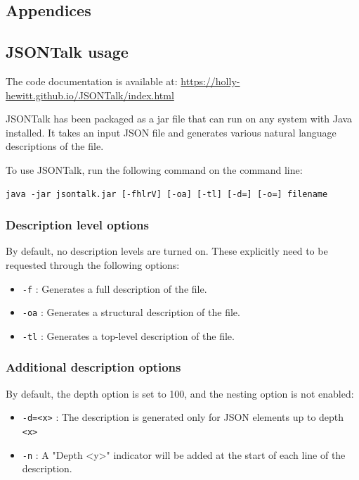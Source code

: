 \documentclass{l4proj}
\begin{document}
\begin{appendices}

\chapter{Appendices}

\section{JSONTalk usage}
The code documentation is available at: \url{https://holly-hewitt.github.io/JSONTalk/index.html}

JSONTalk has been packaged as a jar file that can run on any system with Java installed. It takes an input JSON file and generates various natural language descriptions of the file.

To use JSONTalk, run the following command on the command line:

\begin{verbatim}
java -jar jsontalk.jar [-fhlrV] [-oa] [-tl] [-d=] [-o=] filename
\end{verbatim}

\subsection{Description level options}

By default, no description levels are turned on. These explicitly need to be requested through the following options:

\begin{itemize}
\item \verb|-f| : Generates a full description of the file.
\item \verb|-oa| : Generates a structural description of the file.
\item \verb|-tl| : Generates a top-level description of the file.
\end{itemize}

\subsection{Additional description options}

By default, the depth option is set to 100, and the nesting option is not enabled:

\begin{itemize}
\item \verb|-d=<x>| : The description is generated only for JSON elements up to depth \verb|<x>|
\item \verb|-n| : A "Depth <y>" indicator will be added at the start of each line of the description.
\end{itemize}


\end{appendices}
\end{document}
